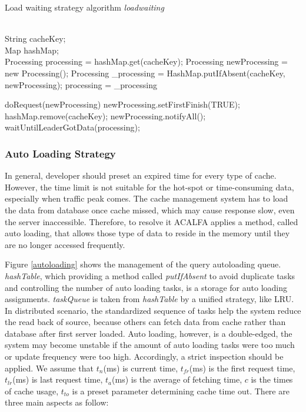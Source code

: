 \documentclass{singlecol-new}
\theoremstyle{TH}{
\newtheorem{lemma}{Lemma}
\newtheorem{theorem}[lemma]{Theorem}
\newtheorem{corrolary}[lemma]{Corrolary}
\newtheorem{conjecture}[lemma]{Conjecture}
\newtheorem{proposition}[lemma]{Proposition}
\newtheorem{claim}[lemma]{Claim}
\newtheorem{stheorem}[lemma]{Wrong Theorem}
}
\theoremstyle{THrm}{
\newtheorem{definition}{Definition}[section]
\newtheorem{question}{Question}[section]
\newtheorem{remark}{Remark}
\newtheorem{scheme}{Scheme}
}
\theoremstyle{THhit}{
\newtheorem{case}{Case}[section]
}
\begin{document}
\begin{algorithm}
\caption{Load waiting strategy algorithm \textit{loadwaiting}}
\label{loadwaitingalg}
\begin{algorithmic}[1]
\REQUIRE ~~\\
  String cacheKey;\\
  Map hashMap;
\ENSURE ~~\\

\STATE Processing processing = hashMap.get(cacheKey);
\STATE Processing newProcessing = new Processing();
\STATE Processing \_processing = HashMap.putIfAbsent(cacheKey, newProcessing);
\STATE processing = \_processing
\ENDIF
\ENDIF

\STATE doRequest(newProcessing)
\STATE newProcessing.setFirstFinish(TRUE);
\STATE hashMap.remove(cacheKey);
\STATE newProcessing.notifyAll();
\ELSE
\STATE waitUntilLeaderGotData(processing);
\ENDIF


\RETURN

\medskip

\end{algorithmic}
\end{algorithm}

\subsubsection{Auto Loading Strategy}
In general, developer should preset an expired time for every type of cache. However, the time limit is not suitable for the hot-spot or time-consuming data, especially when traffic peak comes. The cache management system has to load the data from database once cache missed, which may cause response slow, even the server inaccessible. Therefore, to resolve it ACALFA applies a method, called auto loading, that allows those type of data to reside in the memory until they are no longer accessed frequently.

Figure \ref{autoloading} shows the management of the query autoloading queue. \textit{hashTable}, which providing a method called \textit{putIfAbsent} to avoid duplicate tasks and controlling the number of auto loading tasks, is a storage for auto loading assignments. \textit{taskQueue} is taken from \textit{hashTable} by a unified strategy, like LRU. In distributed scenario, the standardized sequence of tasks help the system reduce the read back of source, because others can fetch data from cache rather than database after first server loaded. Auto loading, however, is a double-edged, the system may become unstable if the amount of auto loading tasks were too much or update frequency were too high. Accordingly, a strict inspection should be applied. We assume that $t_n$(ms) is current time, $t_{fr}$(ms) is the first request time, $t_{lr}$(ms) is last request time,  $t_a$(ms) is the average of fetching time, $c$ is the times of cache usage, $t_{to}$ is a preset parameter determining cache time out. There are three main aspects as follow:
\end{document}
